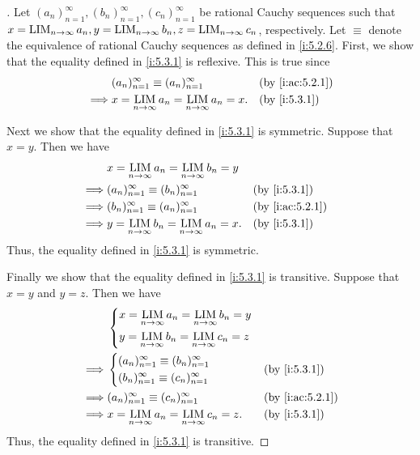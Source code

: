 \begin{proof}[]
  Let \((a_n)_{n = 1}^\infty, (b_n)_{n = 1}^\infty, (c_n)_{n = 1}^\infty\) be rational Cauchy sequences such that \(x = \operatorname*{LIM}_{n \to \infty} a_n, y = \operatorname*{LIM}_{n \to \infty} b_n, z = \operatorname*{LIM}_{n \to \infty} c_n\), respectively.
  Let \(\equiv\) denote the equivalence of rational Cauchy sequences as defined in \cref{i:5.2.6}.
  First, we show that the equality defined in \cref{i:5.3.1} is reflexive.
  This is true since
  \begin{align*}
             & (a_n)_{n = 1}^\infty \equiv (a_n)_{n = 1}^\infty           &  & \by{i:ac:5.2.1} \\
    \implies & x = \LIM_{n \to \infty} a_n = \LIM_{n \to \infty} a_n = x. &  & \by{i:5.3.1}
  \end{align*}

  Next we show that the equality defined in \cref{i:5.3.1} is symmetric.
  Suppose that \(x = y\).
  Then we have
  \begin{align*}
             & x = \LIM_{n \to \infty} a_n = \LIM_{n \to \infty} b_n = y                       \\
    \implies & (a_n)_{n = 1}^\infty \equiv (b_n)_{n = 1}^\infty           &  & \by{i:5.3.1}    \\
    \implies & (b_n)_{n = 1}^\infty \equiv (a_n)_{n = 1}^\infty           &  & \by{i:ac:5.2.1} \\
    \implies & y = \LIM_{n \to \infty} b_n = \LIM_{n \to \infty} a_n = x. &  & \by{i:5.3.1}
  \end{align*}
  Thus, the equality defined in \cref{i:5.3.1} is symmetric.

  Finally we show that the equality defined in \cref{i:5.3.1} is transitive.
  Suppose that \(x = y\) and \(y = z\).
  Then we have
  \begin{align*}
             & \begin{dcases}x = \LIM_{n \to \infty} a_n = \LIM_{n \to \infty} b_n = y \\
                 y = \LIM_{n \to \infty} b_n = \LIM_{n \to \infty} c_n = z
               \end{dcases}                         \\
    \implies & \begin{dcases}
                 (a_n)_{n = 1}^\infty \equiv (b_n)_{n = 1}^\infty \\
                 (b_n)_{n = 1}^\infty \equiv (c_n)_{n = 1}^\infty \\
               \end{dcases}                        &  & \by{i:5.3.1}                                           \\
    \implies & (a_n)_{n = 1}^\infty \equiv (c_n)_{n = 1}^\infty                           &  & \by{i:ac:5.2.1} \\
    \implies & x = \LIM_{n \to \infty} a_n = \LIM_{n \to \infty} c_n = z.                 &  & \by{i:5.3.1}
  \end{align*}
  Thus, the equality defined in \cref{i:5.3.1} is transitive.
\end{proof}


